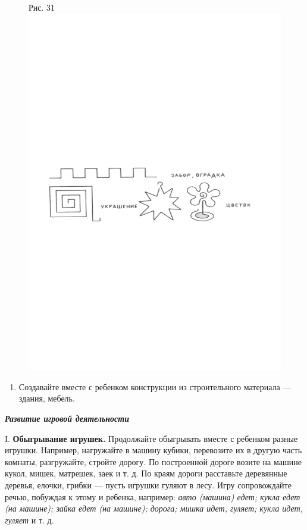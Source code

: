 \documentclass[a5paper]{book}
\renewcommand{\emph}[1]{\textit{#1}}
\begin{document}
\begin{figure}
\centering
Рис. 31 \includegraphics[width=\linewidth]{media/media/image28.png}
\end{figure}


\begin{enumerate}
\def\labelenumi{\arabic{enumi}.}
\setcounter{enumi}{7}
\item
  
  Создавайте вместе с ребенком конструкции из строительного материала
  --- здания, мебель.
  
\end{enumerate}


\emph{\textbf{Развитие игровой деятельности}}

I. \textbf{Обыгрывание игрушек.} Продолжайте обыгрывать вместе с
ребенком разные игрушки. Например, нагружайте в машину кубики,
перевозите их в другую часть комнаты, разгружайте, стройте дорогу. По
построенной дороге возите на машине кукол, мишек, матрешек, заек и т. д.
По краям дороги расставьте деревянные деревья, елочки, грибки --- пусть
игрушки гуляют в лесу. Игру сопровождайте речью, побуждая к этому и
ребенка, например: \emph{авто (машина) едет; кукла едет (на машине);
зайка едет (на машине); дорога; мишка идет, гуляет; кукла идет, гуляет}
и т. д.
\end{document}
